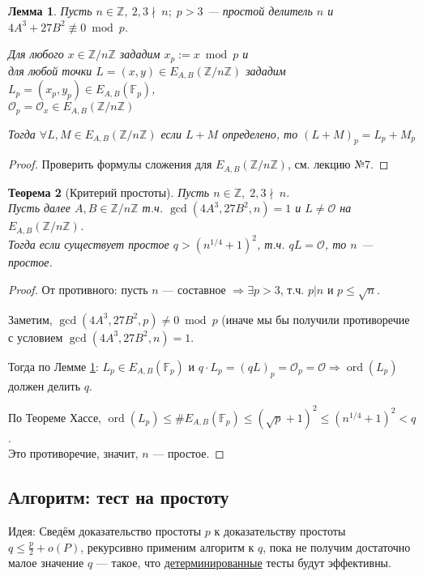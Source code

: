 \documentclass[12pt]{article}
\newcommand{\Z}{{{\mathbb Z}}}
\newcommand{\F}{{{\mathbb F}}}
\newcommand{\bigO}{\mathcal{O}}
\newtheorem{theorem}{Теорема}
\newtheorem{lemma}[theorem]{Лемма}
\theoremstyle{definition}
\theoremstyle{definition}
\theoremstyle{definition}
\begin{document}
\begin{lemma}
\label{l2}
    Пусть $n \in \Z,\ 2,3\nmid \ n;\; p>3$ — простой делитель $n$ и $4A^3 + 27B^2 \not\equiv 0\bmod p$.
    
    Для любого $x \in \Z/n\Z$ зададим $x_p := x\bmod p$ и\\ для любой точки $L = (x,y) \in E_{A,B}( \Z/n\Z)$ зададим $L_p = (x_p, y_p) \in E_{A,B}(\F_p)$, \\
    $\bigO_p = \bigO_x \in E_{A, B}(\Z/n\Z)$
    
    Тогда $\forall L, M \in E_{A,B}(\Z/n\Z)$ если $L+M$ определено, то $(L+M)_p = L_p+M_p$
\end{lemma}
\begin{proof}
    Проверить формулы сложения для $E_{A,B}(\Z/n\Z)$, см. лекцию №7.
\end{proof}

\begin{theorem}[Критерий простоты]
\label{t3}
    Пусть $n \in \Z,\; 2,3 \nmid \ n$. \\
    Пусть далее $A, B \in \Z/n\Z$ т.ч. $\gcd(4A^3, 27B^2, n) =1$ и $L \neq \bigO$ на $E_{A,B}(\Z/n\Z)$.\\
    Тогда если существует простое $q > (n^{1/4} + 1)^2$, т.ч. $qL = \bigO$, то $n$ — простое. 
\end{theorem}
\begin{proof}
    От противного: пусть $n$ — составное $\Rightarrow \exists p > 3$, т.ч. $p | n$ и $p \leq \sqrt{n}$.
    
    Заметим, $\gcd(4A^3, 27B^2, p) \neq 0 \bmod p$ (иначе мы бы получили противоречие с условием $\gcd(4A^3, 27B^2, n) = 1$.
    
    Тогда по Лемме \ref{l2}: $L_p \in E_{A,B}(\F_p)$ и $q\cdot L_p = (qL)_p = \bigO_p = \bigO \Rightarrow \operatorname{ord}(L_p)$ должен делить $q$.
    
    По Теореме Хассе, $\operatorname{ord}(L_p) \leq \#E_{A,B}(\F_p) \leq (\sqrt{p} + 1)^2 \leq (n^{1/4} + 1)^2 < q$. \\
    Это противоречие, значит, $n$ — простое.
\end{proof}

\subsection{Алгоритм: тест на простоту}

Идея: Сведём доказательство простоты $p$ к доказательству простоты $q \leq \frac{p}{2} + o(P)$, рекурсивно применим алгоритм к $q$, пока не получим достаточно малое значение $q$ — такое, что \underline{детерминированные} тесты будут эффективны.
\end{document}
